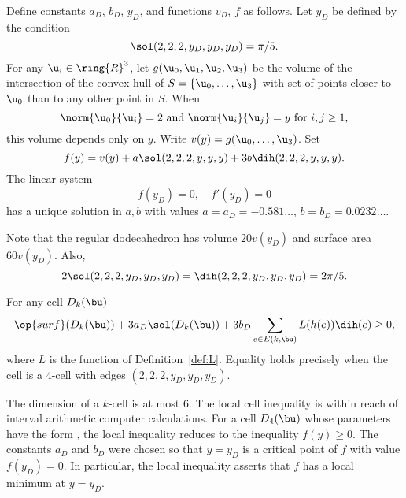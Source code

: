 \begin{definition}[$a_D$,~$b_D$,~$y_D$,~$v_D$,~$f$]
  Define constants $a_D$, $b_D$, $y_D$, and functions $v_D$, $f$ as
  follows.  Let $y_D$ be defined by the condition
\[
\sol(2,2,2,y_D,y_D,y_D) = \pi/5.
\]
For any $\u_i\in\ring{R}^3$, let $g(\u_0,\u_1,\u_2,\u_3)$ be the
volume of the intersection of the convex hull of
$S=\{\u_0,\ldots,\u_3\}$ with set of points closer to $ \u_0$ than to
any other point in $S$.  When
\begin{equation}\label{eqn:uy}
  \norm{\u_0}{\u_i}=2\text{ and }\norm{ \u_i}{ \u_j} = y\text{ for }i,j\ge 1,
\end{equation} 
this volume depends only on $y$. Write $v(y) = g(\u_0,\ldots,\u_3)$.
Set
\[
  f(y) = v(y) + a \sol(2,2,2,y,y,y) + 3 b \dih(2,2,2,y,y,y).
\]
The linear system
\begin{equation}\label{eqn:fyD}
f(y_D) = 0,\quad f'(y_D) = 0
\end{equation}
has a unique solution in $a,b$ with values $a=a_D=-0.581\ldots$,
$b=b_D=0.0232\ldots$.
\end{definition}
%
%
%
%
%
%

Note that the regular dodecahedron has volume $20 v(y_D)$ and surface
area $60 v(y_D)$.  Also,
\begin{equation}
  2\sol(2,2,2,y_D,y_D,y_D) =\dih(2,2,2,y_D,y_D,y_D)=2\pi/5.
\end{equation}
%
%

\begin{lemma}\label{lemma:D-local}
For any cell $D_k(\bu)$
\[
  \op{surf}(D_k(\bu)) + 3 a_D \sol(D_k(\bu)) 
+ 3 b_D \sum_{e\in E(k,\bu)} L(h(e)) \dih(e) \ge 0,
\]
where $L$ is the function of Definition~\ref{def:L}.  Equality holds
precisely when the cell is a $4$-cell with edges
$(2,2,2,y_D,y_D,y_D)$.
\end{lemma}
%

\begin{remark}
  The dimension of a $k$-cell is at most $6$.  The local cell
  inequality is within reach of interval arithmetic computer
  calculations.  For a cell $D_4(\bu)$ whose parameters have the form
  , the local inequality reduces to the inequality
  $f(y)\ge 0$.  The constants $a_D$ and $b_D$ were chosen so that
  $y=y_D$ is a critical point of $f$ with value $f(y_D)=0$.  In
  particular, the local inequality asserts that $f$ has a local
  minimum at $y=y_D$.
\end{remark}

